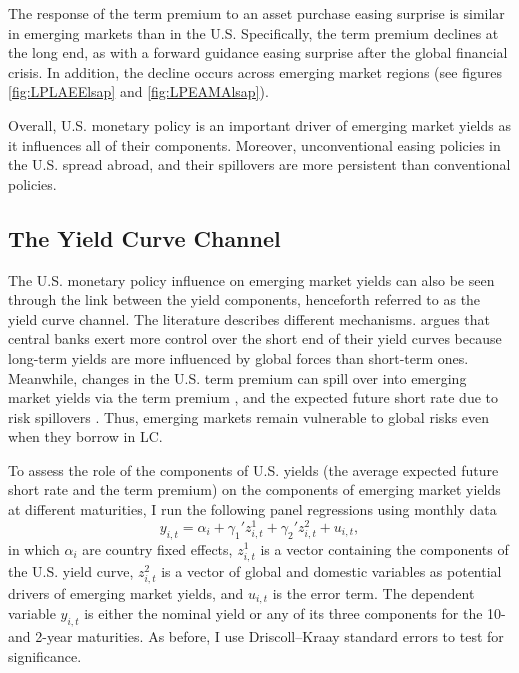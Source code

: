 \documentclass[a4paper, 12pt]{article}
\providecommand{\idxt}{t}
\providecommand{\idxi}{i}
\providecommand{\idxspnl}{\idxi,\idxt}
\providecommand{\yld}{y}
\newcommand{\eqpanelTPreg}{\yld_{\idxspnl} = \alpha_{\idxi} + \gamma_{1}' z^{1}_{\idxspnl} + \gamma_{2}' z^{2}_{\idxspnl} + u_{\idxspnl}}
\begin{document}
The response of the term premium to an asset purchase easing surprise is similar in emerging markets than in the U.S. Specifically, the term premium declines at the long end, as with a forward guidance easing surprise after the global financial crisis. In addition, the decline occurs across emerging market regions (see figures \ref{fig:LPLAEElsap} and \ref{fig:LPEAMAlsap}). 

Overall, U.S. monetary policy is an important driver of emerging market yields as it influences all of their components. Moreover, unconventional easing policies in the U.S. spread abroad, and their spillovers are more persistent than conventional policies. 

\subsection{The Yield Curve Channel} \label{sec:Drivers}
The U.S. monetary policy influence on emerging market yields can also be seen through the link between the yield components, henceforth referred to as the yield curve channel. The literature describes different mechanisms. \cite{Obstfeld:2015} argues that central banks exert more control over the short end of their yield curves because long-term yields are more influenced by global forces than short-term ones. Meanwhile, changes in the U.S. term premium can spill over into emerging market yields via the term premium \citep{Turner:2014}, and the expected future short rate due to risk spillovers \citep{Kalemli-Ozcan:2019}. Thus, emerging markets remain vulnerable to global risks even when they borrow in LC. 

To assess the role of the components of U.S. yields (the average expected future short rate and the term premium) on the components of emerging market yields at different maturities, I run the following panel regressions using monthly data 
\begin{equation} \label{eq:nPanelDCMP}
\eqpanelTPreg ,
\end{equation}
in which \(\alpha_{\idxi}\) are country fixed effects, \(z^{1}_{\idxspnl}\) is a vector containing the components of the U.S. yield curve, \(z^{2}_{\idxspnl}\) is a vector of global and domestic variables as potential drivers of emerging market yields, and \(u_{\idxspnl}\) is the error term. The dependent variable \(\yld_{\idxspnl}\) is either the nominal yield or any of its three components for the 10- and 2-year maturities. As before, I use Driscoll--Kraay standard errors to test for significance. 
\end{document}
